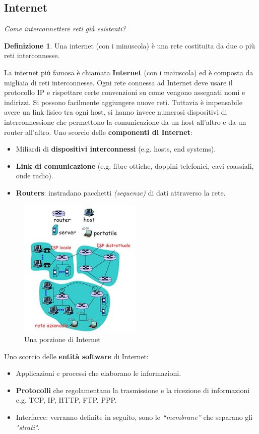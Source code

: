 \documentclass[11pt,a4paper,oneside]{book}
\theoremstyle{definition}
\newtheorem{definition}{Definizione}[section]
\begin{document}
\subsection{Internet}
\textit{Come interconnettere reti già esistenti?}
\theoremstyle{definition}
\begin{definition}
	Una internet (con i minuscola) è una rete costituita da
	due o più reti interconnesse.
\end{definition}
La internet più famosa è chiamata \textbf{Internet} (con i maiuscola) ed è composta da migliaia di reti interconnesse. Ogni rete connessa ad Internet deve usare il protocollo IP e rispettare certe convenzioni su come vengono assegnati nomi e indirizzi.
Si possono facilmente aggiungere nuove reti. \newline Tuttavia è impensabile avere un link fisico tra ogni host, si hanno invece numerosi
dispositivi di interconnessione che permettono la comunicazione da un host all'altro e da un router all'altro.\newline
Uno scorcio delle \textbf{componenti di Internet}:
\begin{itemize}
	\item Miliardi di \textbf{dispositivi interconnessi} (e.g. hosts, end systems).
	\item \textbf{Link di comunicazione} (e.g. fibre ottiche, doppini telefonici,
	      cavi coassiali, onde radio).
	\item \textbf{Routers}: instradano pacchetti \textit{(sequenze)} di dati attraverso la rete.
\end{itemize}
\begin{figure}[!h]
	\includegraphics[scale=0.7]{Immagini/Internet.png}
	\centering
	\caption{Una porzione di Internet}
\end{figure}
Uno scorcio delle \textbf{entità software} di Internet:
\begin{itemize}
	\item Applicazioni e processi che elaborano le informazioni.
	\item \textbf{Protocolli} che regolamentano la trasmissione e la ricezione di informazioni e.g. TCP, IP, HTTP, FTP, PPP.
	\item Interfacce: verranno definite in seguito, sono le \textit{“membrane”} che separano gli \textit{"strati"}.
\end{itemize}
\end{document}
